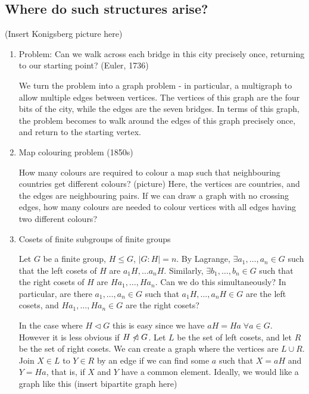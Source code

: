 \documentclass{article}
\begin{document}
\subsection{Where do such structures arise?}
(Insert Konigsberg picture here)

\begin{eg}
    \leavevmode
    \begin{enumerate}[label=\arabic*.]
        \item Problem: Can we walk across each bridge in this city precisely once, returning to our starting point? (Euler, 1736)

            We turn the problem into a graph problem - in particular, a multigraph to allow multiple edges between vertices.  The vertices of this graph are the four bits of the city, while the edges are the seven bridges.
            In terms of this graph, the problem becomes to walk around the edges of this graph precisely once, and return to the starting vertex.

        \item Map colouring problem (1850s)

            How many colours are required to colour a map such that neighbouring countries get different colours?
            (picture)
            Here, the vertices are countries, and the edges are neighbouring pairs.  If we can draw a graph with no crossing edges, how many colours are needed to colour vertices with all edges having two different colours?

        \item Cosets of finite subgroups of finite groups

            Let $G$ be a finite group, $H \leq G$, $|G : H| = n$.  By Lagrange, $\exists a_1, \dots, a_n \in G$ such that the left cosets of $H$ are $a_1 H, \dots a_n H$.
            Similarly, $\exists b_1, \dots, b_n \in G$ such that the right cosets of $H$ are $H a_1, \dots, H a_n$.
            Can we do this simultaneously? In particular, are there $a_1, \dots, a_n \in G$ such that $a_1 H, \dots, a_n H \in G$ are the left cosets, and $H a_1, \dots, H a_n \in G$ are the right cosets?

            In the case where $H \lhd G$ this is easy since we have $a H = H a \; \forall a \in G$.  However it is less obvious if $H \centernot\lhd G$.
            Let $L$ be the set of left cosets, and let $R$ be the set of right cosets. We can create a graph where the vertices are $L \cup R$.
            Join $X \in L$ to $Y \in R$ by an edge if we can find some $a$ such that $X = aH$ and $Y = Ha$, that is, if $X$ and $Y$ have a common element.  Ideally, we would like a graph like this
            (insert bipartite graph here)


\end{enumerate}
\end{eg}
\end{document}
